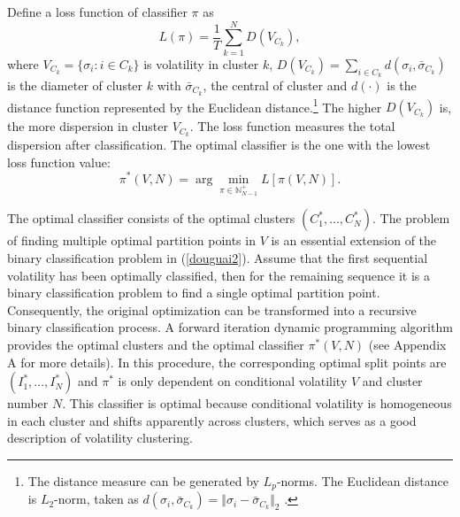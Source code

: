 \documentclass[preprint,12pt,authoryear]{elsarticle}
\begin{document}
Define a loss function of classifier $\pi$ as
\begin{equation}
L(\pi)=\frac 1T\sum_{k=1}^{N}D(V_{C_k}),
\end{equation}
where $V_{C_k}=\{\sigma_i:i\in C_k\}$ is volatility in cluster $k$, $D(V_{C_k})=\sum_{i\in C_k}d(\sigma_i,\bar{\sigma}_{C_k})$ is the diameter of cluster $k$ with $\bar{\sigma}_{C_k}$, the central of cluster and $d(\cdot)$ is the distance function represented by the Euclidean distance.\footnote{The distance measure can be generated by $L_p$-norms. The Euclidean distance is $L_2$-norm, taken as $d(\sigma_i,\bar{\sigma}_{C_k})=\Vert \sigma_i-\bar{\sigma}_{C_k}\Vert _2$ .}
The higher $D(V_{C_k})$ is, the more dispersion in cluster $V_{C_k}$. The loss function measures the total dispersion after classification.
The optimal classifier is the one with the lowest loss function value:
\begin{equation}\pi^{*}\left(V,N\right)=\arg\min_{\pi\in\mathbb{N}^+_{N-1}}L\left[\pi(V,N)\right].\end{equation}

The optimal classifier consists of the optimal clusters $(C_1^{*},\dots,C_N^{*})$. The problem of finding multiple optimal partition points in $V$ is an essential extension of the binary classification problem in (\ref{douguai2}).
Assume that the first sequential volatility has been optimally classified, then for the remaining sequence it is a binary classification problem to find a single optimal partition point.
Consequently, the original optimization can be transformed into a recursive binary classification process.
A forward iteration dynamic programming
algorithm provides the optimal clusters and the optimal classifier
$\pi^{*}\left(V,N\right)$ (see Appendix A for more details).
In this procedure, the corresponding optimal split points are $(I_1^{*},\dots,I_N^{*})$ and
$\pi^{*}$ is only dependent on conditional volatility $V$ and cluster number $N$.
This classifier is optimal because conditional volatility is homogeneous in each cluster and shifts apparently across clusters, which serves as a good description of volatility clustering.
\end{document}
